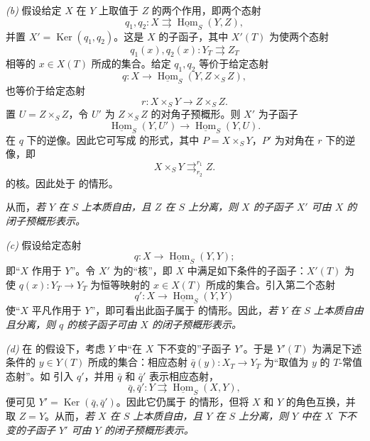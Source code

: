 \smallskip
\noindent{}\textit{(b)}
假设给定 \(X\) 在 \(Y\) 上取值于 \(Z\) 的两个作用，即两个态射
\[
  q_1,q_2:X\rightrightarrows
  \underline{\operatorname{Hom}}_S(Y,Z),
\]
并置 \(X'=\operatorname{Ker}(q_1,q_2)\)。这是 \(X\) 的子函子，其中 \(X'(T)\) 为使两个态射
\[
  q_1(x),q_2(x):Y_T\rightrightarrows Z_T
\]
相等的 \(x\in X(T)\) 所成的集合。给定 \(q_1,q_2\) 等价于给定态射
\[
  q:X\longrightarrow
  \underline{\operatorname{Hom}}_S(Y,Z\times_SZ),
\]
也等价于给定态射
\[
  r:X\times_SY\longrightarrow Z\times_SZ.
\]
置 \(U=Z\times_SZ\)，令 \(U'\) 为 \(Z\times_SZ\) 的对角子预概形。则 \(X'\) 为子函子
\[
  \underline{\operatorname{Hom}}_S(Y,U')
  \longrightarrow
  \underline{\operatorname{Hom}}_S(Y,U).
\]
在 \(q\) 下的逆像。因此它可写成  的形式，其中 \(P=X\times_SY\)，\(P'\) 为对角在 \(r\) 下的逆像，即
\[
  X\times_SY
  \mathop{\rightrightarrows}^{r_1}_{r_2}
  Z.
\]
的核。因此处于  的情形。

从而，\textit{若 \(Y\) 在 \(S\) 上本质自由，且 \(Z\) 在 \(S\) 上分离，则 \(X\) 的子函子 \(X'\) 可由 \(X\) 的闭子预概形表示。}

\smallskip
\noindent{}\textit{(c)}
假设给定态射
\[
  q:X\longrightarrow\underline{\operatorname{Hom}}_S(Y,Y);
\]
即“\(X\) 作用于 \(Y\)”。令 \(X'\) 为的“核”，即 \(X\) 中满足如下条件的子函子：\(X'(T)\) 为使 \(q(x):Y_T\to Y_T\) 为恒等映射的 \(x\in X(T)\) 所成的集合。引入第二个态射
\[
  q':X\longrightarrow\underline{\operatorname{Hom}}_S(Y,Y)
\]
使“\(X\) 平凡作用于 \(Y\)”，即可看出此函子属于  的情形。因此，\textit{若 \(Y\) 在 \(S\) 上本质自由且分离，则 \(q\) 的核子函子可由 \(X\) 的闭子预概形表示。}

\smallskip
\noindent{}\textit{(d)}
在  的假设下，考虑 \(Y\) 中“在 \(X\) 下不变的”子函子 \(Y'\)。于是 \(Y'(T)\) 为满足下述条件的 \(y\in Y(T)\) 所成的集合：相应态射 \(\bar q(y):X_T\to Y_T\) 为“取值为 \(y\) 的 \(T\)-常值态射”。如  引入 \(q'\)，并用 \(\bar q\) 和 \(\bar q'\) 表示相应态射，
\[
  \bar q,\bar q':Y\rightrightarrows
  \underline{\operatorname{Hom}}_S(X,Y),
\]
便可见 \(Y'=\operatorname{Ker}(\bar q,\bar q')\)。因此它仍属于  的情形，但将 \(X\) 和 \(Y\) 的角色互换，并取 \(Z=Y\)。从而，\textit{若 \(X\) 在 \(S\) 上本质自由，且 \(Y\) 在 \(S\) 上分离，则 \(Y\) 中在 \(X\) 下不变的子函子 \(Y'\) 可由 \(Y\) 的闭子预概形表示。}

